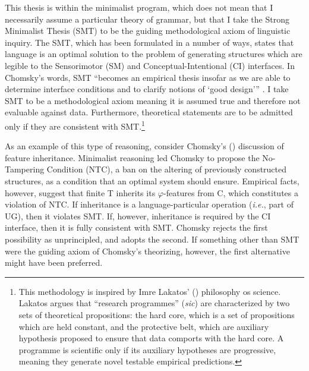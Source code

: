 \documentclass[MilwayThesis]{subfiles}
\begin{document}
This thesis is within the minimalist program, which does not mean that I necessarily assume a particular theory of grammar, but that I take the Strong Minimalist Thesis (SMT) to be the guiding methodological axiom of linguistic inquiry.
The SMT, which has been formulated in a number of ways, states that language is an optimal solution to the problem of generating structures which are legible to the Sensorimotor (SM) and Conceptual-Intentional (CI) interfaces.
In Chomsky's words, SMT ``becomes an empirical thesis insofar as we are able to determine interface conditions and to clarify notions of {`good design'}'' \parencite[1]{chomsky2001derivation}.
I take SMT to be a methodological axiom meaning it is assumed true and therefore not evaluable against data.
Furthermore, theoretical statements are to be admitted only if they are consistent with SMT.\footnote{
  This methodology is inspired by Imre Lakatos' (\citeyear{lakatos1978methodology}) philosophy os science.
  Lakatos argues that ``research programmes'' (\textit{sic}) are characterized by two sets of theoretical propositions: 
  the hard core, which is a set of propositions which are held constant, and the protective belt, which are auxiliary hypothesis proposed to ensure that data comports with the hard core.
  A programme is scientific only if its auxiliary hypotheses are progressive, meaning they generate novel testable empirical predictions.
}

As an example of this type of reasoning, consider Chomsky's (\citeyear[144]{chomsky2008on}) discussion of feature inheritance.
Minimalist reasoning led Chomsky to propose the No-Tampering Condition (NTC), a ban on the altering of previously constructed structures, as a condition that an optimal system should ensure.
Empirical facts, however, suggest that finite T inherits its $\varphi$-features from C, which constitutes a violation of NTC.
If inheritance is a language-particular operation (\textit{i.e.}, part of UG), then it violates SMT.
If, however, inheritance is required by the CI interface, then it is fully consistent with SMT.
Chomsky rejects the first possibility as unprincipled, and adopts the second.
If something other than SMT were the guiding axiom of Chomsky's theorizing, however, the first alternative might have been preferred.
\end{document}
